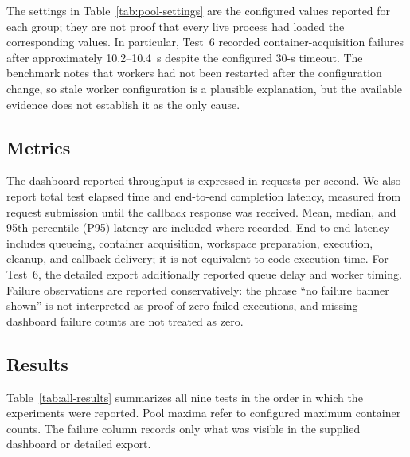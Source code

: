 \documentclass[conference]{IEEEtran}
\begin{document}
The settings in Table~\ref{tab:pool-settings} are the configured values reported for each group; they are not proof that every live process had loaded the corresponding values. In particular, Test~6 recorded container-acquisition failures after approximately 10.2--10.4~s despite the configured 30-s timeout. The benchmark notes that workers had not been restarted after the configuration change, so stale worker configuration is a plausible explanation, but the available evidence does not establish it as the only cause.

\subsection{Metrics}
The dashboard-reported throughput is expressed in requests per second. We also report total test elapsed time and end-to-end completion latency, measured from request submission until the callback response was received. Mean, median, and 95th-percentile (P95) latency are included where recorded. End-to-end latency includes queueing, container acquisition, workspace preparation, execution, cleanup, and callback delivery; it is not equivalent to code execution time. For Test~6, the detailed export additionally reported queue delay and worker timing. Failure observations are reported conservatively: the phrase ``no failure banner shown'' is not interpreted as proof of zero failed executions, and missing dashboard failure counts are not treated as zero.

\subsection{Results}
Table~\ref{tab:all-results} summarizes all nine tests in the order in which the experiments were reported. Pool maxima refer to configured maximum container counts. The failure column records only what was visible in the supplied dashboard or detailed export.
\end{document}
